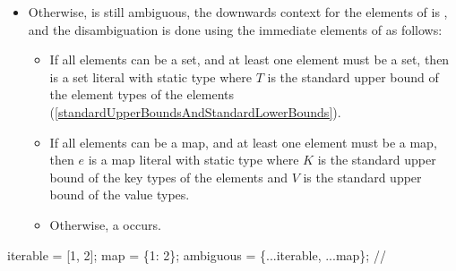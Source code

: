 \documentclass[makeidx]{article}
\begin{document}
{\begin{itemize}
  If $P_k$ is \FreeContext{} or $P$ is \FreeContext,
  the static key type of  is $K$
  where $K$ is the standard upper bound of 
  (\ref{standardUpperBoundsAndStandardLowerBounds}).
  Otherwise the static key type of  is $K$
  where $K$ is determined by downwards inference.

  If $P_v$ is \FreeContext{} or $P$ is \FreeContext,
  the static value type of  is $V$
  where $V$ is the standard upper bound of .
  Otherwise the static value type of  is $V$
  where $V$ is determined by downwards inference.


  The static type of  is then .
\item
  Otherwise,  is still ambiguous,
  the downwards context for the elements of 
  is \FreeContext,
  and the disambiguation is done using
  the immediate elements of  as follows:

  \begin{itemize}
  \item
    If all elements can be a set,
    and at least one element must be a set,
    then  is a set literal with
    static type  where $T$ is
    the standard upper bound of the element types of the elements
    (\ref{standardUpperBoundsAndStandardLowerBounds}).
  \item
    If all elements can be a map,
    and at least one element must be a map, then $e$ is
    a map literal with static type  where $K$ is
    the standard upper bound of the key types of the elements and $V$ is
    the standard upper bound of the value types.
  \item
    Otherwise, a  occurs.
  \end{itemize}
\end{itemize}


\begin{dartCode}
\VAR{} iterable = [1, 2];
\VAR{} map = \{1: 2\};
\VAR{} ambiguous = \{...iterable, ...map\}; // 
\end{dartCode}

}
\end{document}
